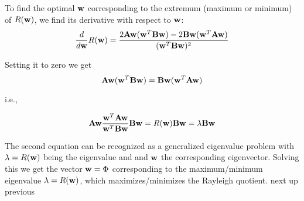 \documentclass[11pt,letterpaper]{article}
\begin{document}
To find the optimal ${\bf w}$ corresponding to the extremum (maximum or minimum) of $R({\bf w})$, we find its derivative with respect to ${\bf w}$: 
\begin{equation}
\frac{d}{d{\bf w}}R({\bf w}) =\frac{2{\bf A}{\bf w}({\bf w}^T{\bf B}{\bf w}) -2 {\bf B}{\bf w} ({\bf w}^T{\bf A}{\bf w})}{({\bf w}^T{\bf B}{\bf w})^2}
\end{equation}

\noindent Setting it to zero we get 
\begin{equation}
{\bf A}{\bf w}({\bf w}^T{\bf B}{\bf w})={\bf B}{\bf w}({\bf w}^T{\bf A}{\bf w}) 
\end{equation}

\noindent i.e.,

\begin{equation}
 {\bf A}{\bf w} \frac{{\bf w}^T{\bf A}{\bf w}}{{\bf w}^T{\bf B}{\bf w}}   {\bf B}{\bf w} = R({\bf w}){\bf B}{\bf w}=\lambda {\bf B}{\bf w}
\end{equation}


\noindent The second equation can be recognized as a generalized eigenvalue problem with  $\lambda=R({\bf w})$ being the eigenvalue and and ${\bf w}$ the corresponding eigenvector. Solving this we get the vector ${\bf w}=\Phi$ corresponding to the maximum/minimum eigenvalue $\lambda=R({\bf w})$, which maximizes/minimizes the Rayleigh quotient.
 next  up  previous 
\end{document}
